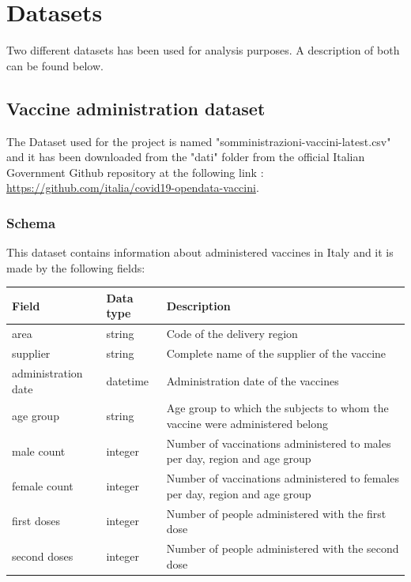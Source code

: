 \documentclass{article}
\begin{document}
\hfill\break
\newpage

\newpage
\section{Datasets}
Two different datasets has been used for analysis purposes. A description of both can be found below.
\subsection{Vaccine administration dataset}
The Dataset used for the project is named {\selectfont"somministrazioni-vaccini-latest.csv"} and it has been downloaded from the {\selectfont"dati"} folder from the official Italian Government Github repository at the following link :\\ \url{https://github.com/italia/covid19-opendata-vaccini}.
\subsubsection{Schema}
\label{subsec:vaccination schema}
This dataset contains information about administered vaccines in Italy and it is made by the following fields:
\hfill\break
\begin{center}
\begin{tabular}{ |m{4cm}|m{2cm}|m{4.5cm}|}
  \hline
  \bfseries{Field} & \bfseries{Data type} & \bfseries{Description} \\
  \hline\hline
  area & string & Code of the delivery region\\
    \hline
      supplier & string & Complete name of the supplier of the vaccine\\
    \hline
          administration date & datetime & Administration date of the vaccines\\
              \hline
          age group & string & Age group to which the subjects to whom the vaccine were administered belong\\
                        \hline
          male count & integer & Number of vaccinations administered to males per day, region and age group\\
                        \hline
          female count & integer & Number of vaccinations administered to females per day, region and age group\\
    \hline
  first doses & integer & Number of people administered with the first dose\\ 
    \hline
  second doses & integer & Number of people administered with the second dose\\
    \hline

\end{tabular}
\end{center}
\end{document}
